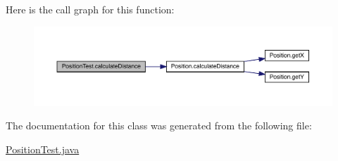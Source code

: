 Here is the call graph for this function\+:
\nopagebreak
\begin{figure}[H]
\begin{center}
\leavevmode
\includegraphics[width=350pt]{class_position_test_ac8109a5d9da5c243e9c2b513404271f7_cgraph}
\end{center}
\end{figure}


The documentation for this class was generated from the following file\+:\begin{DoxyCompactItemize}
\item 
\mbox{\hyperlink{_position_test_8java}{Position\+Test.\+java}}\end{DoxyCompactItemize}
